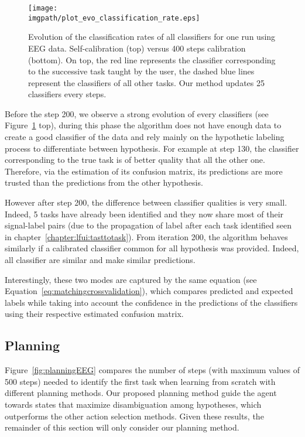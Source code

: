 \begin{figure}[!htbp]
\centering
\texttt{[image: \\imgpath/plot\_evo\_classification\_rate.eps]}
\caption{Evolution of the classification rates of all classifiers for one run using EEG data. Self-calibration (top) versus 400 steps calibration (bottom). On top, the red line represents the classifier corresponding to the successive task taught by the user, the dashed blue lines represent the classifiers of all other tasks. Our method updates 25 classifiers every steps.}
\label{fig:sequence_evolution}
\end{figure}

Before the step 200, we observe a strong evolution of every classifiers (see Figure~\ref{fig:sequence_evolution} top), during this phase the algorithm does not have enough data to create a good classifier of the data and rely mainly on the hypothetic labeling process to differentiate between hypothesis. For example at step 130, the classifier corresponding to the true task is of better quality that all the other one. Therefore, via the estimation of its confusion matrix, its predictions are more trusted than the predictions from the other hypothesis.

However after step 200, the difference between classifier qualities is very small. Indeed, 5 tasks have already been identified and they now share most of their signal-label pairs (due to the propagation of label after each task identified seen in chapter~\ref{chapter:lfui:tasttotask}). From iteration 200, the algorithm behaves similarly if a calibrated classifier common for all hypothesis was provided. Indeed,  all classifier are similar and make similar predictions. 

Interestingly, these two modes are captured by the same equation (see Equation~\ref{eq:matchingcrossvalidation}), which compares predicted and expected labels while taking into account the confidence in the predictions of the classifiers using their respective estimated confusion matrix.

\subsection{Planning}

Figure~\ref{fig:planningEEG} compares the number of steps (with maximum values of 500 steps) needed to identify the first task when learning from scratch with different planning methods. Our proposed planning method guide the agent towards states that maximize disambiguation among hypotheses, which outperforms the other action selection methods. Given these results, the remainder of this section will only consider our planning method.


